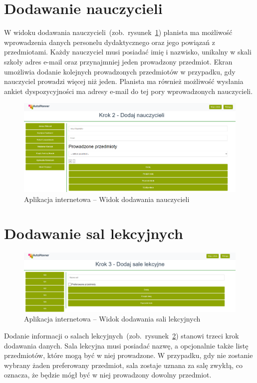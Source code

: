 \section{Dodawanie nauczycieli}
W widoku dodawania nauczycieli~(zob.~rysunek~\ref{rys:teacher}) planista ma możliwość wprowadzenia danych personelu dydaktycznego oraz jego powiązań z przedmiotami. Każdy nauczyciel musi posiadać imię i nazwisko, unikalny w skali szkoły adres e-mail oraz przynajmniej jeden prowadzony przedmiot. Ekran umożliwia dodanie kolejnych prowadzonych przedmiotów w przypadku, gdy nauczyciel prowadzi więcej niż jeden. Planista ma również możliwość wysłania ankiet dyspozycyjności ma adresy e-mail do tej pory wprowadzonych nauczycieli.
\begin{figure}[!ht]
\centering\includegraphics[width=\textwidth]{figures/teacher}
\caption{Aplikacja internetowa -- Widok dodawania nauczycieli}\label{rys:teacher}
\end{figure}
\section{Dodawanie sal lekcyjnych}
\begin{figure}[!ht]
\centering\includegraphics[width=14cm]{figures/classroom}
\caption{Aplikacja internetowa -- Widok dodawania sali lekcyjnych}\label{rys:classroom}
\end{figure}
Dodanie informacji o salach lekcyjnych~(zob.~rysunek~\ref{rys:classroom}) stanowi trzeci krok dodawania danych. Sala lekcyjna musi posiadać nazwę, a opcjonalnie także listę przedmiotów, które mogą być w  niej prowadzone. W przypadku, gdy nie zostanie wybrany żaden preferowany przedmiot, sala zostaje uznana za salę zwykłą, co oznacza, że będzie mógł być w niej prowadzony dowolny przedmiot.
